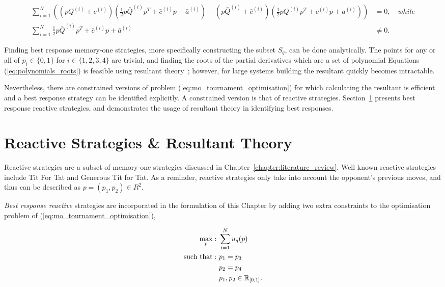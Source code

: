 {\scriptsize
\begin{align}\label{eq:polynomials_roots}
    \displaystyle\sum\limits_{i=1} ^ {N} \left(
    \left(pQ^{(i)} + c^{(i)}\right) \left(\frac{1}{2} p\bar{Q}^{(i)} p^T + \bar{c}^{(i)} p + \bar{a}^ {(i)}\right)
    - \left(p\bar{Q}^{(i)} + \bar{c}^{(i)}\right) \left(\frac{1}{2} pQ^{(i)} p^T + c^{(i)} p + a^ {(i)}\right)\right)
    &= 0, \quad {while} \\
    \displaystyle\sum\limits_{i=1} ^ {N} \frac{1}{2} p\bar{Q}^{(i)} p^T + \bar{c}^{(i)} p + \bar{a}^ {(i)} &\neq 0.
\end{align}}

Finding best response memory-one strategies, more specifically constructing the
subset \(S_q\), can be done analytically. The points for any or all of \(p_i \in
\{0, 1\}\) for \(i \in \{1, 2, 3, 4\}\) are trivial, and finding the
roots of the partial derivatives which are a set of polynomial Equations
(\ref{eq:polynomials_roots}) is feasible using resultant
theory~\cite{Jonsson2005}; however, for large systems building the resultant
quickly becomes intractable.

Nevertheless, there are constrained versions of problem
(\ref{eq:mo_tournament_optimisation}) for which calculating
the resultant is efficient and a best response strategy can be identified
explicitly. A constrained version is that of reactive strategies.
Section~\ref{section:reactive_strategies} presents best response
reactive strategies, and demonstrates the usage of resultant theory in
identifying best responses.

\section{Reactive Strategies \& Resultant Theory}\label{section:reactive_strategies}

Reactive strategies are a subset of memory-one strategies discussed
in Chapter~\ref{chapter:literature_review}. Well known reactive strategies
include Tit For Tat and Generous Tit for Tat. As a reminder, reactive strategies
only take into account the opponent's previous moves, and thus can be described
as \(p = (p_1, p_2) \in R^2\).

\textit{Best response reactive} strategies are incorporated in the formulation of
this Chapter by adding two extra constraints to the
optimisation problem of (\ref{eq:mo_tournament_optimisation}),

\begin{equation}\label{eq:reactive_tournament_optimisation}
\begin{aligned}
\max_p: & \ \sum_{i=1} ^ N u_q(p)
\\
\text{such that}: & \ p_1 = p_3 \\
                  & \ p_2 = p_4\\
                  & \ p_1, p_2 \in \mathbb{R}_{[0, 1]}.
\end{aligned}
\end{equation}

